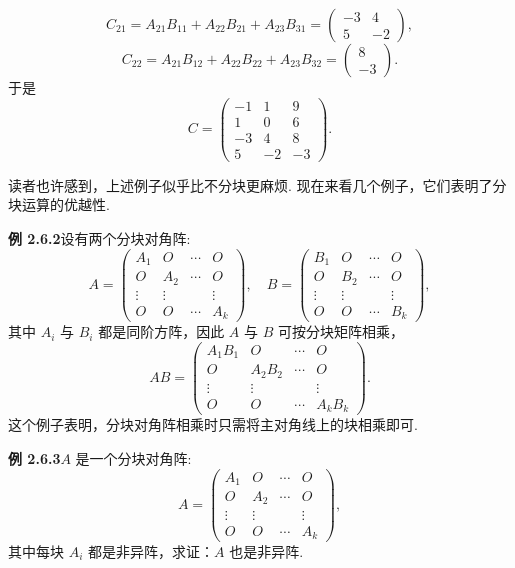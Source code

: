 \documentclass[UTF8,12pt,a4paper,fontset=fandol]{ctexart}
\begin{document}
\[
C_{21}=A_{21}B_{11}+A_{22}B_{21}+A_{23}B_{31}=
\left(\begin{array}{rr}
-3 & 4\\
5 & -2
\end{array}\right),
\]
\[
C_{22}=A_{21}B_{12}+A_{22}B_{22}+A_{23}B_{32}=
\left(\begin{array}{r}
8\\
-3
\end{array}\right).
\]
于是
\[
C=\left(\begin{array}{rr|r}
-1 & 1 & 9\\
1 & 0 & 6\\ \hline
-3 & 4 & 8\\
5 & -2 & -3
\end{array}\right).
\]

读者也许感到，上述例子似乎比不分块更麻烦. 现在来看几个例子，它们表明了分块运算的优越性.

\noindent\textbf{例 2.6.2}\quad 设有两个分块对角阵:
\[
A=\left(\begin{array}{cccc}
A_1 & O & \cdots & O\\
O & A_2 & \cdots & O\\
\vdots & \vdots & & \vdots\\
O & O & \cdots & A_k
\end{array}\right),\quad
B=\left(\begin{array}{cccc}
B_1 & O & \cdots & O\\
O & B_2 & \cdots & O\\
\vdots & \vdots & & \vdots\\
O & O & \cdots & B_k
\end{array}\right),
\]
其中 $A_i$ 与 $B_i$ 都是同阶方阵，因此 $A$ 与 $B$ 可按分块矩阵相乘，
\[
AB=\left(\begin{array}{cccc}
A_1B_1 & O & \cdots & O\\
O & A_2B_2 & \cdots & O\\
\vdots & \vdots & & \vdots\\
O & O & \cdots & A_kB_k
\end{array}\right).
\]
这个例子表明，分块对角阵相乘时只需将主对角线上的块相乘即可.

\noindent\textbf{例 2.6.3}\quad $A$ 是一个分块对角阵:
\[
A=\left(\begin{array}{cccc}
A_1 & O & \cdots & O\\
O & A_2 & \cdots & O\\
\vdots & \vdots & & \vdots\\
O & O & \cdots & A_k
\end{array}\right),
\]
其中每块 $A_i$ 都是非异阵，求证：$A$ 也是非异阵.
\end{document}
